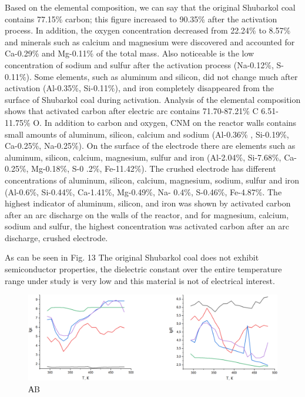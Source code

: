 \begin{multicols}{2}
Based on the elemental composition, we can say that the original
Shubarkol coal contains 77.15\% carbon; this figure increased to 90.35\%
after the activation process. In addition, the oxygen concentration
decreased from 22.24\% to 8.57\% and minerals such as calcium and
magnesium were discovered and accounted for Ca-0.29\% and Mg-0.11\% of
the total mass. Also noticeable is the low concentration of sodium and
sulfur after the activation process (Na-0.12\%, S-0.11\%). Some
elements, such as aluminum and silicon, did not change much after
activation (Al-0.35\%, Si-0.11\%), and iron completely disappeared from
the surface of Shubarkol coal during activation. Analysis of the
elemental composition shows that activated carbon after electric arc
contains 71.70-87.21\% C 6.51-11.75\% O. In addition to carbon and
oxygen, CNM on the reactor walls contains small amounts of aluminum,
silicon, calcium and sodium (Al-0.36\% , Si-0.19\%, Ca-0.25\%,
Na-0.25\%). On the surface of the electrode there are elements such as
aluminum, silicon, calcium, magnesium, sulfur and iron (Al-2.04\%,
Si-7.68\%, Ca-0.25\%, Mg-0.18\%, S-0 .2\%, Fe-11.42\%). The crushed
electrode has different concentrations of aluminum, silicon, calcium,
magnesium, sodium, sulfur and iron (Al-0.6\%, Si-0.44\%, Ca-1.41\%,
Mg-0.49\%, Na- 0.4\%, S-0.46\%, Fe-4.87\%. The highest indicator of
aluminum, silicon, and iron was shown by activated carbon after an arc
discharge on the walls of the reactor, and for magnesium, calcium,
sodium and sulfur, the highest concentration was activated carbon after
an arc discharge, crushed electrode.

As can be seen in Fig. 13 The original Shubarkol coal does not exhibit
semiconductor properties, the dielectric constant over the entire
temperature range under study is very low and this material is not of
electrical interest.
\end{multicols}

\begin{figure}[H]
	\centering
	\includegraphics[width=\textwidth]{assets/65}
	\caption*{А\hspace{8cm}B}
\end{figure}

